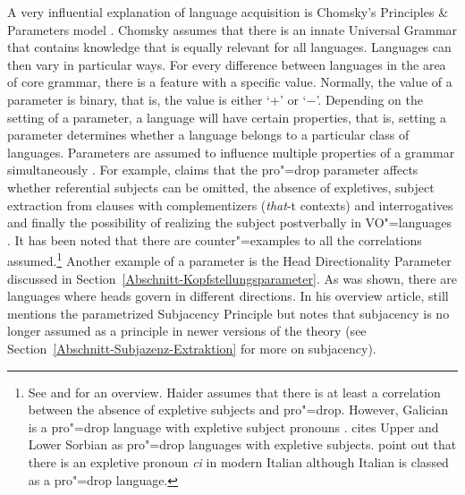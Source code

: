 A very influential explanation of language acquisition is Chomsky's Principles \& Parameters model
\citeyearpar{Chomsky81a}. Chomsky assumes that there is an innate Universal Grammar that contains knowledge that is equally relevant for all languages.
Languages can then vary in particular ways. For every difference between languages in the area of core grammar, there is a feature with a specific
value. Normally, the value of a parameter is binary, that is, the value is either `+' or `$-$'.
Depending on the setting of a parameter, a language will have certain properties, that is, setting a parameter determines whether
a language belongs to a particular class of languages.
Parameters are assumed to influence multiple properties of a grammar simultaneously
\citep[]{Chomsky81a}.
For example, \citet{Rizzi86a} claims that the pro"=drop parameter affects
whether referential subjects can be omitted, the absence of expletives, subject 
extraction from clauses with complementizers (\emph{that}-t contexts) and interrogatives and
finally the possibility of realizing the subject postverbally in VO"=languages \parencites[see][Section~4.3]{Chomsky81a}[]{Meisel95a}. It has been noted that there are counter"=examples to all the correlations assumed.\footnote{%
\label{fn-Expletiva-Pro-Drop}%
  See  and  for an overview. Haider assumes that there is at least a correlation
  between the absence of expletive subjects and pro"=drop. However, Galician is a pro"=drop language with expletive subject
  pronouns \citep[Section~2.5]{RU90a-u}. \citet[]{Franks95a-u} cites Upper and Lower Sorbian as pro"=drop
  languages with expletive subjects. \citet[]{SP2002b} point out that there is an expletive pronoun \emph{ci} in modern Italian
  although Italian is classed as a pro"=drop language.}
Another example of a parameter is the Head Directionality Parameter discussed in Section~\ref{Abschnitt-Kopfstellungsparameter}.
As was shown, there are languages where heads govern in different directions. In his overview article, \citet{Haider2001a} still mentions
the parametrized Subjacency Principle but notes that subjacency is no longer assumed as a principle
in newer versions of the theory (see Section~\ref{Abschnitt-Subjazenz-Extraktion} for more on subjacency).

